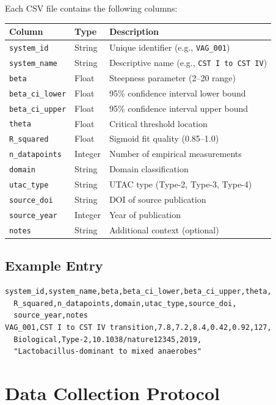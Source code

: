 \documentclass[11pt,a4paper]{article}
\begin{document}
Each CSV file contains the following columns:

\begin{tabular}{lll}
\toprule
\textbf{Column} & \textbf{Type} & \textbf{Description} \\
\midrule
\texttt{system\_id} & String & Unique identifier (e.g., \texttt{VAG\_001}) \\
\texttt{system\_name} & String & Descriptive name (e.g., \texttt{CST I to CST IV}) \\
\texttt{beta} & Float & Steepness parameter (2--20 range) \\
\texttt{beta\_ci\_lower} & Float & 95\% confidence interval lower bound \\
\texttt{beta\_ci\_upper} & Float & 95\% confidence interval upper bound \\
\texttt{theta} & Float & Critical threshold location \\
\texttt{R\_squared} & Float & Sigmoid fit quality (0.85--1.0) \\
\texttt{n\_datapoints} & Integer & Number of empirical measurements \\
\texttt{domain} & String & Domain classification \\
\texttt{utac\_type} & String & UTAC type (Type-2, Type-3, Type-4) \\
\texttt{source\_doi} & String & DOI of source publication \\
\texttt{source\_year} & Integer & Year of publication \\
\texttt{notes} & String & Additional context (optional) \\
\bottomrule
\end{tabular}

\subsection{Example Entry}

\begin{verbatim}
system_id,system_name,beta,beta_ci_lower,beta_ci_upper,theta,
  R_squared,n_datapoints,domain,utac_type,source_doi,
  source_year,notes
VAG_001,CST I to CST IV transition,7.8,7.2,8.4,0.42,0.92,127,
  Biological,Type-2,10.1038/nature12345,2019,
  "Lactobacillus-dominant to mixed anaerobes"
\end{verbatim}

\section{Data Collection Protocol}
\end{document}
